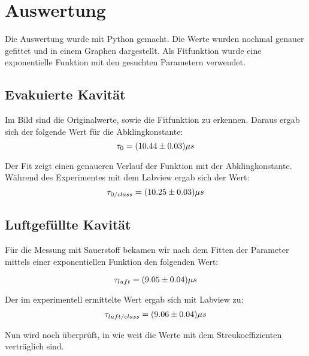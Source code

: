 \section{Auswertung}

Die Auswertung wurde mit Python gemacht. Die Werte wurden nochmal genauer gefittet und in einem Graphen dargestellt. Als Fitfunktion wurde eine exponentielle Funktion mit den gesuchten Parametern verwendet. 

\subsection{Evakuierte Kavität}


Im Bild sind die Originalwerte, sowie die Fitfunktion zu erkennen. Daraus ergab sich der folgende Wert für die Abklingkonstante:
\begin{equation}
\notag
\tau_{0}= (10.44 \pm 0.03)\mu s
\end{equation}

Der Fit zeigt einen genaueren Verlauf der Funktion mit der Abklingkonstante. Während des Experimentes mit dem Labview ergab sich der Wert: 
\begin{equation}
\notag
\tau_{0/class}= (10.25 \pm 0.03)\mu s
\end{equation}

\subsection{Luftgefüllte Kavität}


Für die Messung mit Sauerstoff bekamen wir nach dem Fitten der Parameter mittels einer exponentiellen Funktion den folgenden Wert:

\begin{equation}
\notag
\tau_{luft}= (9.05 \pm 0.04)\mu s
\end{equation}

Der im experimentell ermittelte Wert ergab sich mit Labview zu:
\begin{equation}
\notag
\tau_{luft/class}= (9.06 \pm 0.04)\mu s
\end{equation}

Nun wird noch überprüft, in wie weit die Werte mit dem Streukoeffizienten verträglich sind.

